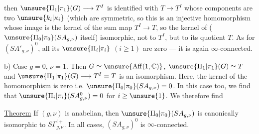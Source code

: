 

then $\unsure{\Pi_1|\pi_1}(G)\longrightarrow T^I$ is identified with
$T\longrightarrow T^I$ whose components are  two
$\unsure{k_i|\kappa_i}$ (which are symmetric, so this is an injective homomorphism whose image is the kernel of the sum map
$T^I\longrightarrow T$, so  the kernel of
( $\unsure{\Pi_0|\pi_0}(SA_{g,\nu})$ itself)
 isomorphic, not to $T^I$, but to its quotient $T$.
As for $(SA'_{g,\nu})^0$, all its $\unsure{\Pi_i|\pi_i}$ $(i\geq1)$ are zero --- it is again $\infty$-connected.

b) Case $g=0$, $\nu=1$. Then $G\simeq\unsure{\operatorname{Aff}(1,\mathbb C)}$,
$\unsure{\Pi_1|\pi_1}(G)\simeq T$ and
$\unsure{\Pi_1|\pi_1}(G)\longrightarrow T^I=T$ is an isomorphism.
Here,  the kernel of the homomorphism
is zero
i.e.  $\unsure{\Pi_0|\pi_0}(SA_{g,\nu})=0$.
In this case too, we find that $\unsure{\Pi_i|\pi_i}(SA_{g,\nu}^0)=0$
for  $i\geq\unsure{1}$. We therefore find

\uline{Theorem} 
If $(g,\nu)$ is anabelian, then $\unsure{\Pi_0|\pi_0}(SA_{g,\nu})$ is canonically isomorphic to $S\Gamma_{g,\nu}^{!+}$.
In all cases, $(SA_{g,\nu})^0$ is $\infty$-connected.

